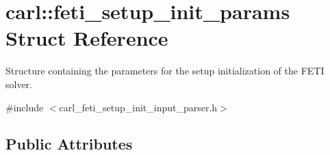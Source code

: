 \hypertarget{structcarl_1_1feti__setup__init__params}{}\section{carl\+:\+:feti\+\_\+setup\+\_\+init\+\_\+params Struct Reference}
\label{structcarl_1_1feti__setup__init__params}


Structure containing the parameters for the setup initialization of the F\+E\+T\+I solver.  




{\ttfamily \#include $<$carl\+\_\+feti\+\_\+setup\+\_\+init\+\_\+input\+\_\+parser.\+h$>$}

\subsection*{Public Attributes}
